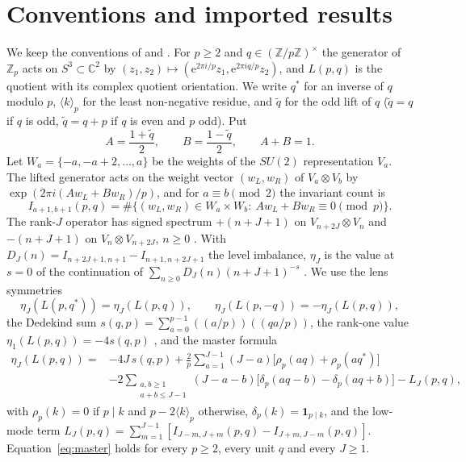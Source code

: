 \documentclass[11pt]{article}
\theoremstyle{definition}
\newcommand{\Z}{\mathbb Z}
\newcommand{\C}{\mathbb C}
\newcommand{\ind}{\mathbf 1}
\newcommand{\e}{\mathrm e}
\newcommand{\sawtooth}[1]{\left(\!\left(#1\right)\!\right)}
\begin{document}
\section{Conventions and imported results}
\label{sec:conventions}

We keep the conventions of \cite[Sec.~2]{MahmoodP1Collection2026} and
\cite[Sec.~2]{LensChirality2026}.  For $p\geq2$ and
$q\in(\Z/p\Z)^\times$ the generator of $\Z_p$ acts on
$S^3\subset\C^2$ by $(z_1,z_2)\mapsto(\e^{2\pi i/p}z_1,\e^{2\pi iq/p}z_2)$,
and $L(p,q)$ is the quotient with its complex quotient orientation.  We
write $q^*$ for an inverse of $q$ modulo $p$, $\langle k\rangle_p$ for
the least non-negative residue, and $\tilde q$ for the odd lift of $q$
($\tilde q=q$ if $q$ is odd, $\tilde q=q+p$ if $q$ is even and $p$ odd).
Put
\begin{equation}
 A=\frac{1+\tilde q}{2},\qquad B=\frac{1-\tilde q}{2},\qquad A+B=1.
 \label{eq:AB}
\end{equation}
Let $W_a=\{-a,-a+2,\ldots,a\}$ be the weights of the $SU(2)$
representation $V_a$.  The lifted generator acts on the weight vector
$(w_L,w_R)$ of $V_a\otimes V_b$ by $\exp(2\pi i(Aw_L+Bw_R)/p)$, and for
$a\equiv b\pmod2$ the invariant count is
\[
 I_{a+1,b+1}(p,q)=\#\{(w_L,w_R)\in W_a\times W_b:\ Aw_L+Bw_R\equiv0\pmod p\}.
\]
The rank-$J$ operator has signed spectrum $+(n+J+1)$ on
$V_{n+2J}\otimes V_n$ and $-(n+J+1)$ on $V_n\otimes V_{n+2J}$, $n\geq0$
\cite[Thm.~3.1]{MahmoodP1Collection2026}.  With
$D_J(n)=I_{n+2J+1,n+1}-I_{n+1,n+2J+1}$ the level imbalance, $\eta_J$ is
the value at $s=0$ of the continuation of $\sum_{n\geq0}D_J(n)(n+J+1)^{-s}$
\cite[Prop.~4.1]{MahmoodP1Collection2026}.  We use the lens symmetries
\begin{equation}
 \eta_J(L(p,q^*))=\eta_J(L(p,q)),\qquad
 \eta_J(L(p,-q))=-\eta_J(L(p,q)),
 \label{eq:lens-symmetries}
\end{equation}
the Dedekind sum
$s(q,p)=\sum_{a=0}^{p-1}\sawtooth{a/p}\sawtooth{qa/p}$, the rank-one value
$\eta_1(L(p,q))=-4s(q,p)$ \cite[Cor.~5.8]{MahmoodP1Collection2026}, and
the master formula \cite[Thm.~5.1]{MahmoodP1Collection2026}
\begin{align}
 \eta_J(L(p,q))={}&-4J\,s(q,p)
 +\frac2p\sum_{a=1}^{J-1}(J-a)\bigl[\rho_p(aq)+\rho_p(aq^*)\bigr]\nonumber\\
 &-2\!\!\sum_{\substack{a,b\geq1\\a+b\leq J-1}}\!\!(J-a-b)
 \bigl[\delta_p(aq-b)-\delta_p(aq+b)\bigr]
 -L_J(p,q),
 \label{eq:master}
\end{align}
with $\rho_p(k)=0$ if $p\mid k$ and $p-2\langle k\rangle_p$ otherwise,
$\delta_p(k)=\ind_{p\mid k}$, and the low-mode term
$L_J(p,q)=\sum_{m=1}^{J-1}[I_{J-m,J+m}(p,q)-I_{J+m,J-m}(p,q)]$.
Equation~\eqref{eq:master} holds for every $p\geq2$, every unit $q$ and
every $J\geq1$.
\end{document}

